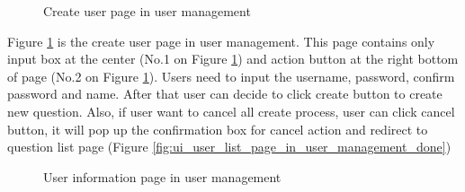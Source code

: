 \documentclass[12pt,oneside,openright,a4paper]{cpe-english-project}
\begin{document}
\begin{figure}[!h]\centering
		\caption{Create user page in user management}\label{fig:ui_create_user_page_in_user_management_done}
	\end{figure}
Figure \ref*{fig:ui_create_user_page_in_user_management_done} is the create user page in user management. This page contains only 
input box at the center (No.1 on Figure \ref*{fig:ui_create_user_page_in_user_management_done}) and action button at the right bottom of page 
(No.2 on Figure \ref*{fig:ui_create_user_page_in_user_management_done}).
Users need to input the username, password, confirm password and name. After that 
user can decide to click create button to create new question. Also, if user want to cancel all 
create process, user can click cancel button, it will pop up the confirmation box for cancel 
action and redirect to question list page (Figure \ref*{fig:ui_user_list_page_in_user_management_done})
\begin{figure}[!h]\centering
		\caption{User information page in user management}\label{fig:ui_user_information_page-in_user_management_done}
	\end{figure}
\end{document}
